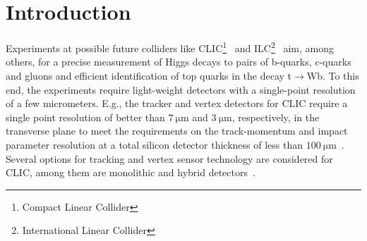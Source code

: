 \documentclass[preprint]{elsarticle}
\begin{document}
\linenumbers
\section{Introduction}
%  

Experiments at possible future colliders like CLIC\footnote{Compact Linear Collider}~\cite{cdr} and ILC\footnote{International Linear Collider}~\cite{ILCcdr} aim, among others,
 for a precise measurement of Higgs decays to pairs of b-quarks, c-quarks and gluons and efficient identification of top quarks in the decay t$\mathrm{\rightarrow}$Wb.
To this end, the experiments require light-weight detectors with a single-point resolution of a few micrometers. 
E.g., the tracker and vertex detectors for CLIC require a single point resolution of better than $\SI{7}{\um}$ and $\SI{3}{\um}$, respectively, in the transverse plane
 to meet the requirements on the track-momentum and impact parameter resolution at a total silicon detector thickness of less than $\SI{100}{\um}$~\cite{det}.
Several options for tracking and vertex sensor technology are considered for CLIC, among them are monolithic and hybrid detectors~\cite{clicyellowreport}.
\end{document}
